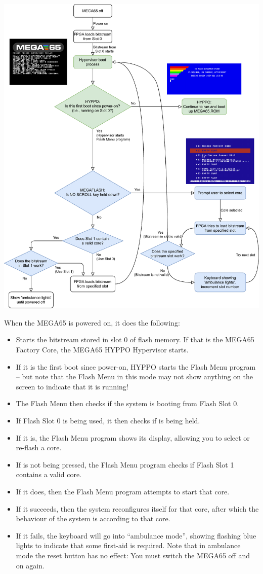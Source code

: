 \includegraphics[width=\linewidth]{images/illustrations/flashmenu-flowchart.pdf}

When the MEGA65 is
powered on, it does the following:
\begin{itemize}
\item Starts the bitstream stored in slot 0 of flash memory. If that is the MEGA65 Factory Core, the MEGA65 HYPPO
      Hypervisor starts.
\item If it is the first boot since power-on, HYPPO starts the Flash Menu program -- but note that the Flash Menu in
      this mode may not show anything on the screen to indicate that it is running!
\item The Flash Menu then checks if the system is booting from Flash Slot 0.
\item If Flash Slot 0 is being used, it then checks if  is being held.
\item If it is, the Flash Menu program shows its display, allowing you to select or re-flash a core.
\item If  is not being pressed, the Flash Menu program checks if Flash Slot 1 contains a valid
      core.
\item If it does, then the Flash Menu program attempts to start that core.
\item If it succeeds, then the system reconfigures itself for that core, after which the behaviour of the system is
      according to that core.
\item If it fails, the keyboard will go into ``ambulance mode'', showing flashing blue lights to indicate that some
      first-aid is required. Note that in ambulance mode the reset button has no effect: You must switch the
      MEGA65 off and on again.
\end{itemize}



